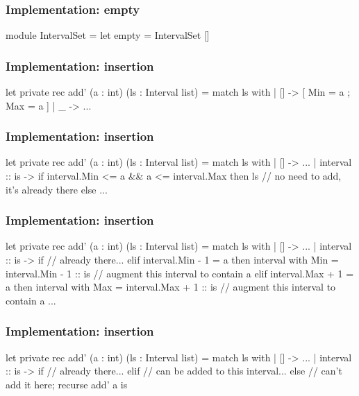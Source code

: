 \documentclass{beamer}
\begin{document}
\begin{frame}[fragile]
\frametitle{Implementation: empty}

\begin{fslisting}
[<RequireQualifiedAccess>]
module IntervalSet =
    let empty = IntervalSet []

\end{fslisting}
\end{frame}

\begin{frame}[fragile]
\frametitle{Implementation: insertion}
\begin{fslisting}
let private rec add' (a : int) (ls : Interval list) =
    match ls with
    | [] -> [{ Min = a ; Max = a }]
    | _ -> ...
\end{fslisting}
\end{frame}

\begin{frame}[fragile]
\frametitle{Implementation: insertion}
\begin{fslisting}
let private rec add' (a : int) (ls : Interval list) =
    match ls with
    | [] -> ...
    | interval :: is ->
        if interval.Min <= a && a <= interval.Max then
            ls // no need to add, it's already there
        else ...
\end{fslisting}
\end{frame}

\begin{frame}[fragile]
\frametitle{Implementation: insertion}
\begin{fslisting}
let private rec add' (a : int) (ls : Interval list) =
    match ls with
    | [] -> ...
    | interval :: is ->
        if // already there...
        elif interval.Min - 1 = a then
            { interval with Min = interval.Min - 1 }
            :: is // augment this interval to contain a
        elif interval.Max + 1 = a then
            { interval with Max = interval.Max + 1 }
            :: is // augment this interval to contain a
        ...
\end{fslisting}
\end{frame}

\begin{frame}[fragile]
\frametitle{Implementation: insertion}
\begin{fslisting}
let private rec add' (a : int) (ls : Interval list) =
    match ls with
    | [] -> ...
    | interval :: is ->
        if // already there...
        elif // can be added to this interval...
        else // can't add it here; recurse
            add' a is
\end{fslisting}
\end{frame}
\end{document}
